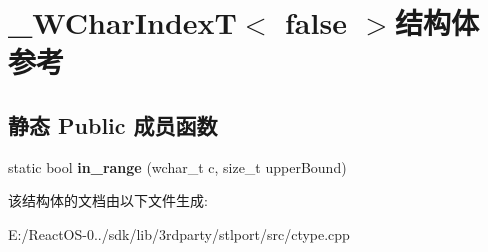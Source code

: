 \hypertarget{struct___w_char_index_t_3_01false_01_4}{}\section{\+\_\+\+W\+Char\+IndexT$<$ false $>$结构体 参考}
\label{struct___w_char_index_t_3_01false_01_4}
\subsection*{静态 Public 成员函数}
\begin{DoxyCompactItemize}
\item 
\mbox{\label{struct___w_char_index_t_3_01false_01_4_aba56fb49d8b2893c38ac9fce04f21671}} 
static bool {\bfseries in\+\_\+range} (wchar\+\_\+t c, size\+\_\+t upper\+Bound)
\end{DoxyCompactItemize}


该结构体的文档由以下文件生成\+:\begin{DoxyCompactItemize}
\item 
E\+:/\+React\+O\+S-\/0../sdk/lib/3rdparty/stlport/src/ctype.\+cpp\end{DoxyCompactItemize}
